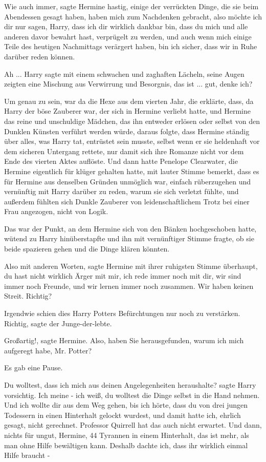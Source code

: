 \glqq{}Wie auch immer\grqq{}, sagte Hermine hastig, \glqq{}einige der verrückten
Dinge, die sie beim Abendessen gesagt haben, haben mich zum Nachdenken gebracht,
also möchte ich dir nur sagen, Harry, dass ich dir wirklich dankbar bin, dass du
mich und alle anderen davor bewahrt hast, verprügelt zu werden, und auch wenn
mich einige Teile des heutigen Nachmittags verärgert haben, bin ich sicher, dass
wir in Ruhe darüber reden können.\grqq{}

\glqq{}Ah ...\grqq{} Harry sagte mit einem schwachen und zaghaften Lächeln, seine
Augen zeigten eine Mischung aus Verwirrung und Besorgnis, \glqq{}das ist ... gut,
denke ich?\grqq{}

Um genau zu sein, war da die Hexe aus dem vierten Jahr, die erklärte, dass, da
Harry der böse Zauberer war, der sich in Hermine verliebt hatte, und Hermine das
reine und unschuldige Mädchen, das ihn entweder erlösen oder selbst von den
Dunklen Künsten verführt werden würde, daraus folgte, dass Hermine ständig über
alles, was Harry tat, entrüstet sein musste, selbst wenn er sie heldenhaft vor
dem sicheren Untergang rettete, nur damit sich ihre Romanze nicht vor dem Ende
des vierten Aktes auflöste. Und dann hatte Penelope Clearwater, die Hermine
eigentlich für klüger gehalten hatte, mit lauter Stimme bemerkt, dass es für
Hermine aus denselben Gründen unmöglich war, einfach rüberzugehen und vernünftig
mit Harry darüber zu reden, warum sie sich verletzt fühlte, und außerdem fühlten
sich Dunkle Zauberer von leidenschaftlichem Trotz bei einer Frau angezogen,
nicht von Logik.

Das war der Punkt, an dem Hermine sich von den Bänken hochgeschoben hatte,
wütend zu Harry hinüberstapfte und ihn mit vernünftiger Stimme fragte, ob sie
beide spazieren gehen und die Dinge klären könnten.

\glqq{}Also mit anderen Worten\grqq{}, sagte Hermine mit ihrer ruhigsten Stimme
überhaupt, \glqq{}du hast nicht wirklich Ärger mit mir, ich rede immer noch mit
dir, wir sind immer noch Freunde, und wir lernen immer noch zusammen. Wir haben
keinen Streit. Richtig?\grqq{}

Irgendwie schien dies Harry Potters Befürchtungen nur noch zu verstärken. \glqq
Richtig\grqq{}, sagte der Junge-der-lebte.

\glqq{}Großartig!\grqq{}, sagte Hermine. \glqq{}Also, haben Sie herausgefunden,
warum ich mich aufgeregt habe, Mr. Potter?\grqq{}

Es gab eine Pause.

\glqq{}Du wolltest, dass ich mich aus deinen Angelegenheiten heraushalte?\grqq{}
sagte Harry vorsichtig. \glqq{}Ich meine - ich weiß, du wolltest die Dinge selbst
in die Hand nehmen. Und ich wollte dir aus dem Weg gehen, bis ich hörte, dass du
von drei jungen Todessern in einen Hinterhalt gelockt wurdest, und damit hatte
ich, ehrlich gesagt, nicht gerechnet. Professor Quirrell hat das auch nicht
erwartet. Und dann, nichts für ungut, Hermine, 44 Tyrannen in einem Hinterhalt,
das ist mehr, als man ohne Hilfe bewältigen kann. Deshalb dachte ich, dass ihr
wirklich einmal Hilfe braucht -\grqq{}

